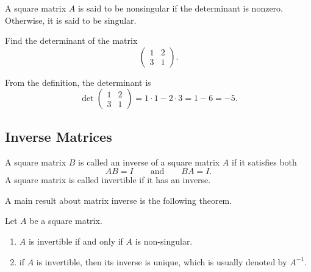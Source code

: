 A square matrix $A$ is said to be nonsingular if the determinant is nonzero. Otherwise, it is said to be singular.

\begin{example}
  Find the determinant of the matrix
  \[\begin{pmatrix}
    1 & 2 \\
    3 & 1
  \end{pmatrix}.\]
\end{example}
\begin{solution}
  From the definition, the determinant is
  \[
  \det\begin{pmatrix}
    1 & 2 \\
    3 & 1
  \end{pmatrix} = 1\cdot 1 - 2\cdot 3=1-6=-5. 
  \]
\end{solution}

\subsection*{Inverse Matrices}

A square matrix $B$ is called an inverse of a square matrix $A$ if it satisfies both
\[AB=I \qquad\text{and}\qquad BA=I.\]
A square matrix is called invertible if it has an inverse.

A main result about matrix inverse is the following theorem.
\begin{theorem}
  Let $A$ be a square matrix.
  \begin{enumerate}
    \item $A$ is invertible if and only if $A$ is non-singular.
    \item if $A$ is invertible, then its inverse is unique, which is usually denoted by $A^{-1}$.
  \end{enumerate}
\end{theorem}

